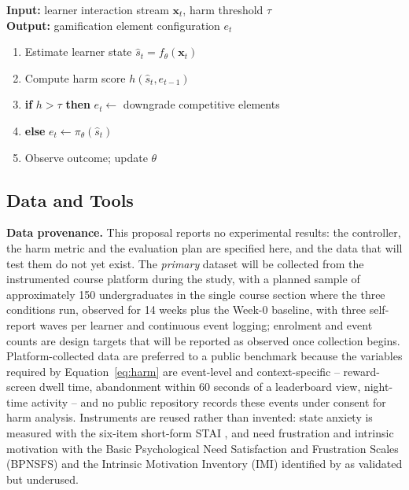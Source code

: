 \documentclass[12pt,a4paper]{article}
\begin{document}
\begin{justify}
\begin{algorithm}[H]
\caption{Adaptive harm-aware gamification controller (pseudocode outline)}
\label{alg:controller}
\begin{flushleft}
\fontsize{10pt}{12pt}\selectfont
\textbf{Input:} learner interaction stream $\mathbf{x}_t$, harm threshold $\tau$ \\
\textbf{Output:} gamification element configuration $e_t$
\end{flushleft}
\hrulefill
\vspace{0.2cm}
\begin{enumerate}
    \item Estimate learner state $\hat{s}_t = f_\theta(\mathbf{x}_t)$   %
    \item Compute harm score $h(\hat{s}_t, e_{t-1})$
    \item \textbf{if} $h > \tau$ \textbf{then} $e_t \leftarrow$ downgrade competitive elements
    \item \textbf{else} $e_t \leftarrow \pi_\theta(\hat{s}_t)$   %
    \item Observe outcome; update $\theta$   %
\end{enumerate}
\hrulefill
\end{algorithm}

\subsection{Data and Tools}

\textbf{Data provenance.} This proposal reports no experimental results: the controller, the harm
metric and the evaluation plan are specified here, and the data that will test them do not yet
exist. The \emph{primary} dataset will be collected from the instrumented course platform during
the study, with a planned sample of approximately 150 undergraduates in the single course section
where the three conditions run, observed for 14 weeks plus the Week-0 baseline, with three
self-report waves per learner and continuous event logging; enrolment and event counts are design
targets that will be reported as observed once collection begins. Platform-collected data are
preferred to a public benchmark because the variables required by Equation~\ref{eq:harm} are
event-level and context-specific -- reward-screen dwell time, abandonment within 60 seconds of a
leaderboard view, night-time activity -- and no public repository records these events under
consent for harm analysis. Instruments are reused rather than invented: state anxiety is measured
with the six-item short-form STAI \parencite{marteau1992stai}, and need frustration and intrinsic
motivation with the Basic Psychological Need Satisfaction and Frustration Scales (BPNSFS) and the Intrinsic Motivation Inventory (IMI) identified by \textcite{gao2024sdt} as validated but underused.


\end{justify}
\end{document}
